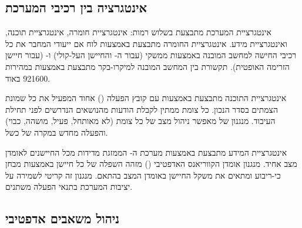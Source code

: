 \begin{table}[htbp]
\centering
\caption{מפרט חומרה של רכיבי המערכת המשולבת. (Hardware specifications of integrated system components.)}
\label{tab:ch07_hardware_specs}
\end{table}

\subsection{אינטגרציה בין רכיבי המערכת}
\label{sec:ch07_integration}

אינטגרציית המערכת מתבצעת בשלוש רמות: אינטגרציית חומרה, אינטגרציית תוכנה, ואינטגרציית מידע. אינטגרציית החומרה מתבצעת באמצעות לוח אם ייעודי המחבר את כל רכיבי החישה למחשב המובנה באמצעות ממשקי  (עבור ה- והחיישן העל-קולי) ו- (עבור חיישן הזרימה האופטית). תקשורת בין המחשב המובנה למיקרו-בקר מתבצעת באמצעות  במהירות 921600 באוד. \cite{CrewAIDocs}

אינטגרציית התוכנה מתבצעת באמצעות  עם קובץ הפעלה () אחוד המפעיל את כל שמונת הצמתים בסדר הנכון. כל צומת ממתין לקבלת הודעות מהנושאים הנדרשים לפני תחילת העיבוד. מנגנון  של  מאפשר ניהול מצב של כל צומת (לא מאותחל, פעיל, מושהה, כבוי) והפעלה מחדש במקרה של כשל.

אינטגרציית המידע מתבצעת באמצעות מערכת ה- הממזגת מדידות מכל החיישנים לאומדן מצב אחיד. מנגנון אומדן הקווריאנס האדפטיבי () מזהה השפלה של כל חיישן באמצעות מבחן כי-ריבוע ומתאים את משקל החיישן באומדן המצב בהתאם. מנגנון זה קריטי לשמירה על יציבות המערכת בתנאי הפעלה משתנים. \cite{Thrun2005ProbRobotics}

\subsection{ניהול משאבים אדפטיבי}
\label{sec:ch07_resource_management}

